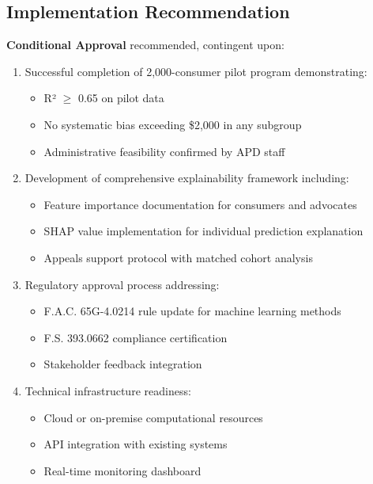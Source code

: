 \subsection{Implementation Recommendation}

\textbf{Conditional Approval} recommended, contingent upon:

\begin{enumerate}
    \item Successful completion of 2,000-consumer pilot program demonstrating:
    \begin{itemize}
        \item R² $\geq$ 0.65 on pilot data
        \item No systematic bias exceeding \$2,000 in any subgroup
        \item Administrative feasibility confirmed by APD staff
    \end{itemize}
    
    \item Development of comprehensive explainability framework including:
    \begin{itemize}
        \item Feature importance documentation for consumers and advocates
        \item SHAP value implementation for individual prediction explanation
        \item Appeals support protocol with matched cohort analysis
    \end{itemize}
    
    \item Regulatory approval process addressing:
    \begin{itemize}
        \item F.A.C. 65G-4.0214 rule update for machine learning methods
        \item F.S. 393.0662 compliance certification
        \item Stakeholder feedback integration
    \end{itemize}
    
    \item Technical infrastructure readiness:
    \begin{itemize}
        \item Cloud or on-premise computational resources
        \item API integration with existing systems
        \item Real-time monitoring dashboard
    \end{itemize}
\end{enumerate}


